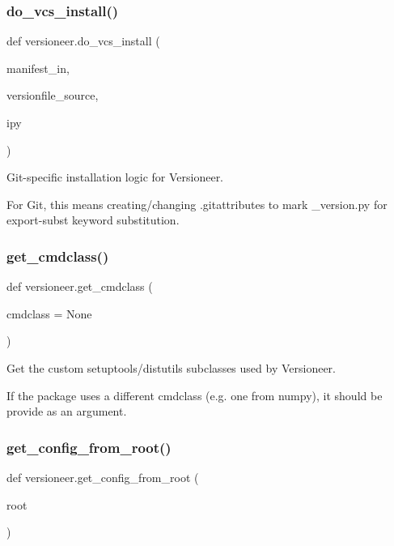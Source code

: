 \subsubsection{\texorpdfstring{do\+\_\+vcs\+\_\+install()}{do\_vcs\_install()}}
{\footnotesize\ttfamily def versioneer.\+do\+\_\+vcs\+\_\+install (\begin{DoxyParamCaption}\item[{}]{manifest\+\_\+in,  }\item[{}]{versionfile\+\_\+source,  }\item[{}]{ipy }\end{DoxyParamCaption})}

\begin{DoxyVerb}Git-specific installation logic for Versioneer.

For Git, this means creating/changing .gitattributes to mark _version.py
for export-subst keyword substitution.
\end{DoxyVerb}
 \mbox{\label{namespaceversioneer_ac032e254c046410f09612d27049516f3}} 
\subsubsection{\texorpdfstring{get\+\_\+cmdclass()}{get\_cmdclass()}}
{\footnotesize\ttfamily def versioneer.\+get\+\_\+cmdclass (\begin{DoxyParamCaption}\item[{}]{cmdclass = {\ttfamily None} }\end{DoxyParamCaption})}

\begin{DoxyVerb}Get the custom setuptools/distutils subclasses used by Versioneer.

If the package uses a different cmdclass (e.g. one from numpy), it
should be provide as an argument.
\end{DoxyVerb}
 \mbox{\label{namespaceversioneer_a754a5133f3e3c7b19f27c9ce2e32a2b3}} 
\subsubsection{\texorpdfstring{get\+\_\+config\+\_\+from\+\_\+root()}{get\_config\_from\_root()}}
{\footnotesize\ttfamily def versioneer.\+get\+\_\+config\+\_\+from\+\_\+root (\begin{DoxyParamCaption}\item[{}]{root }\end{DoxyParamCaption})}

